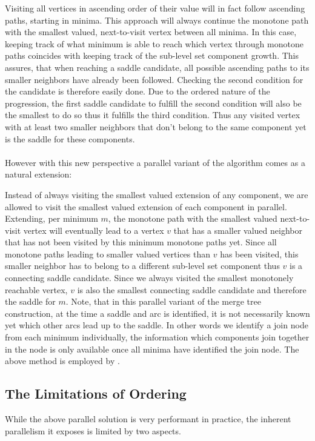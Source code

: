 \documentclass{scrartcl}
\begin{document}
Visiting all vertices in ascending order of their value will in fact follow ascending paths, starting in minima. This approach will always continue the monotone path with the smallest valued, next-to-visit vertex between all minima. In this case, keeping track of what minimum is able to reach which vertex through monotone paths coincides with keeping track of the sub-level set component growth. This assures, that when reaching a saddle candidate, all possible ascending paths to its smaller neighbors have already been followed. Checking the second condition for the candidate is therefore easily done. Due to the ordered nature of the progression, the first saddle candidate to fulfill the second condition will also be the smallest to do so thus it fulfills the third condition. Thus any visited vertex with at least two smaller neighbors that don't belong to the same component yet is the saddle for these components.

\paragraph{}
However with this new perspective a parallel variant of the algorithm comes as a natural extension: 

Instead of always visiting the smallest valued extension of any component, we are allowed to visit the smallest valued extension of each component in parallel. Extending, per minimum \(m\), the monotone path with the smallest valued next-to-visit vertex will eventually lead to a vertex \(v\) that has a smaller valued neighbor that has not been visited by this minimum monotone paths yet. Since all monotone paths leading to smaller valued vertices than \(v\) has been visited, this smaller neighbor has to belong to a different sub-level set component thus \(v\) is a connecting saddle candidate. Since we always visited the smallest monotonely reachable vertex, \(v\) is also the smallest connecting saddle candidate and therefore the saddle for \(m\). Note, that in this parallel variant of the merge tree construction, at the time a saddle and arc is identified, it is not necessarily known yet which other arcs lead up to the saddle. In other words we identify a join node from each minimum individually, the information which components join together in the node is only available once all minima have identified the join node. The above method is employed by \cite{FTM}.

\subsection{The Limitations of Ordering}
While the above parallel solution is very performant in practice, the inherent parallelism it exposes is limited by two aspects. 
\end{document}
